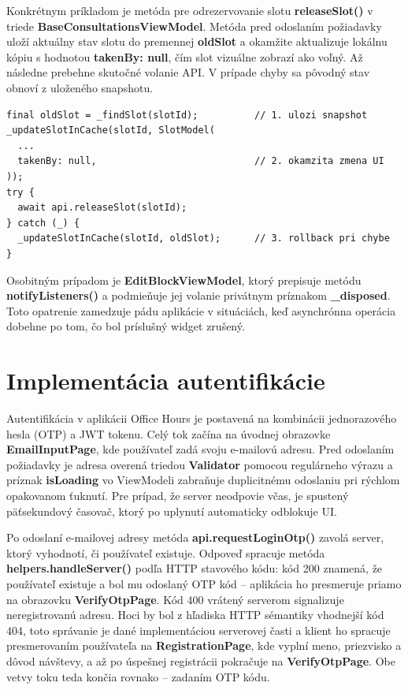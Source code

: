 Konkrétnym príkladom je metóda pre odrezervovanie slotu \textbf{releaseSlot()} v triede 
\textbf{BaseConsultationsViewModel}. Metóda pred odoslaním 
požiadavky uloží aktuálny stav slotu do premennej \textbf{oldSlot} 
a okamžite aktualizuje lokálnu kópiu s hodnotou \textbf{takenBy: null}, 
čím slot vizuálne zobrazí ako voľný. Až následne prebehne skutočné 
volanie API. V prípade chyby sa pôvodný stav obnoví z uloženého 
snapshotu.

\begin{verbatim}
final oldSlot = _findSlot(slotId);          // 1. ulozi snapshot
_updateSlotInCache(slotId, SlotModel(
  ...
  takenBy: null,                            // 2. okamzita zmena UI
));
try {
  await api.releaseSlot(slotId);
} catch (_) {
  _updateSlotInCache(slotId, oldSlot);      // 3. rollback pri chybe
}
\end{verbatim}

Osobitným prípadom je \textbf{EditBlockViewModel}, ktorý prepisuje metódu \textbf{notifyListeners()} a podmieňuje jej volanie privátnym príznakom \textbf{\_disposed}. Toto opatrenie zamedzuje pádu aplikácie v situáciách, keď asynchrónna operácia dobehne po tom, čo bol príslušný widget zrušený.

\section{Implementácia autentifikácie}
\label{sec:impl-autentifikacia}

Autentifikácia v aplikácii Office Hours je postavená na kombinácii jednorazového hesla (OTP) a JWT tokenu. Celý tok začína na úvodnej obrazovke \textbf{EmailInputPage}, kde používateľ zadá svoju e-mailovú adresu. Pred odoslaním požiadavky je adresa overená triedou \textbf{Validator} pomocou regulárneho výrazu a príznak \textbf{isLoading} vo ViewModeli zabraňuje duplicitnému odoslaniu pri rýchlom opakovanom ťuknutí. Pre prípad, že server neodpovie včas, je spustený päťsekundový časovač, ktorý po uplynutí automaticky odblokuje UI.

Po odoslaní e-mailovej adresy metóda \textbf{api.requestLoginOtp()} zavolá server, ktorý vyhodnotí, či používateľ existuje. Odpoveď spracuje metóda \textbf{helpers.handleServer()} podľa HTTP stavového kódu: kód 200 znamená, že používateľ existuje a bol mu odoslaný OTP kód – aplikácia ho presmeruje priamo na obrazovku \textbf{VerifyOtpPage}. Kód 400 vrátený serverom signalizuje neregistrovanú adresu. Hoci by bol z hľadiska HTTP sémantiky vhodnejší kód 404, toto správanie je dané implementáciou serverovej časti a klient ho spracuje presmerovaním používateľa na \textbf{RegistrationPage}, kde vyplní meno, priezvisko a dôvod návštevy, a až po úspešnej registrácii pokračuje na \textbf{VerifyOtpPage}. Obe vetvy toku teda končia rovnako – zadaním OTP kódu.

